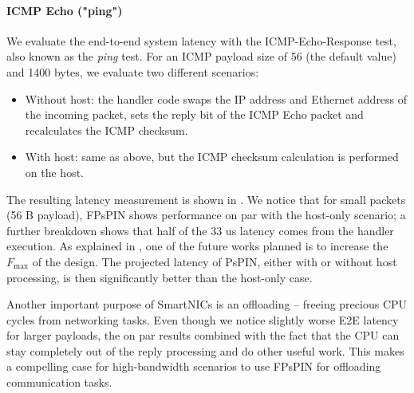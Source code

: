 \paragraph{ICMP Echo ("ping")}  We evaluate the end-to-end system latency with the ICMP-Echo-Response test, also known as the \emph{ping} test.  For an ICMP payload size of 56 (the default value) and 1400 bytes, we evaluate two different scenarios:

\begin{itemize}
    \item Without host: the handler code swaps the IP address and Ethernet address of the incoming packet, sets the reply bit of the ICMP Echo packet and recalculates the ICMP checksum.
    \item With host: same as above, but the ICMP checksum calculation is performed on the host.
\end{itemize}

The resulting latency measurement is shown in .  We notice that for small packets (56 B payload), FPsPIN shows performance on par with the host-only scenario; a further breakdown shows that half of the 33 us latency comes from the handler execution.  As explained in , one of the future works planned is to increase the $F_{\text{max}}$ of the design.  The projected latency of PsPIN, either with or without host processing, is then significantly better than the host-only case.

Another important purpose of SmartNICs is an offloading -- freeing precious CPU cycles from networking tasks.  Even though we notice slightly worse E2E latency for larger payloads, the on par results combined with the fact that the CPU can stay completely out of the reply processing and do other useful work.  This makes a compelling case for high-bandwidth scenarios to use FPsPIN for offloading communication tasks.

